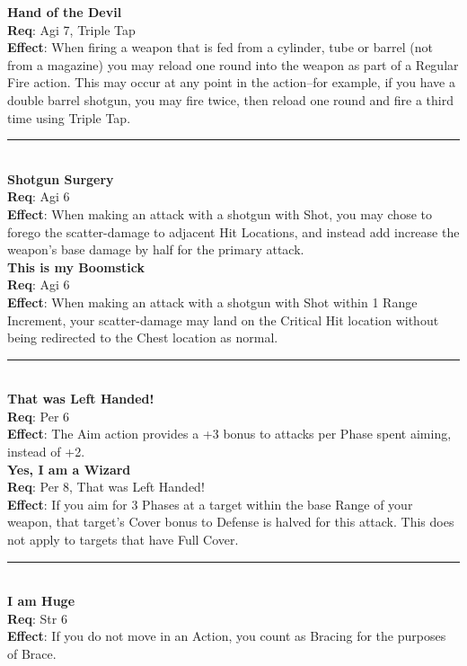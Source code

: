 \documentclass[a4paper, twocolumn, openany]{book}
\newlength{\indentlen}
\newcommand{\tabto}[1]{\setlength{\leftskip}{#1\indentlen}}
\begin{document}
{		{\bfseries Hand of the Devil}\\
		{\bfseries Req}: Agi 7, Triple Tap\\
		{\bfseries Effect}: When firing a weapon that is fed from a cylinder, tube or barrel (not from
		a magazine) you may reload one round into the weapon as part of a Regular Fire action.
		This may occur at any point in the action--for example, if you have a double barrel
		shotgun, you may fire twice, then reload one round and fire a third time using Triple Tap.\\ \hrule\ \\

\tabto{0}
{\bfseries Shotgun Surgery}\\
{\bfseries Req}: Agi 6\\
{\bfseries Effect}: When making an attack with a shotgun with Shot, you may chose to forego the
scatter-damage to adjacent Hit Locations, and instead add increase the weapon’s base damage
by half for the primary attack.\\

	\tabto{1}
	{\bfseries This is my Boomstick}\\
	{\bfseries Req}: Agi 6\\
	{\bfseries Effect}: When making an attack with a shotgun with Shot within 1 Range Increment, your
	scatter-damage may land on the Critical Hit location without being redirected to the
	Chest location as normal.\\ \hrule\ \\

\tabto{0}
{\bfseries That was Left Handed!}\\
{\bfseries Req}: Per 6\\
{\bfseries Effect}: The Aim action provides a +3 bonus to attacks per Phase spent aiming, instead of +2.\\

	\tabto{1}
	{\bfseries Yes, I am a Wizard}\\
	{\bfseries Req}: Per 8, That was Left Handed!\\
	{\bfseries Effect}: If you aim for 3 Phases at a target within the base Range of your weapon, that
	target’s Cover bonus to Defense is halved for this attack. This does not apply to targets that
	have Full Cover.\\ \hrule\ \\

\tabto{0}
{\bfseries I am Huge}\\
{\bfseries Req}: Str 6\\
{\bfseries Effect}:  If you do not move in an Action, you count as Bracing for the purposes of Brace.\\

}
\end{document}
